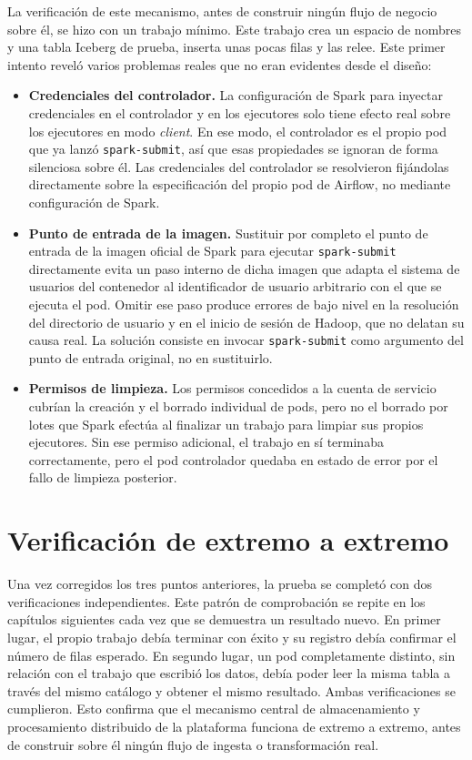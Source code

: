 La verificación de este mecanismo, antes de construir ningún flujo de
negocio sobre él, se hizo con un trabajo mínimo. Este trabajo crea un
espacio de nombres y una tabla Iceberg de prueba, inserta unas pocas filas
y las relee. Este primer intento reveló varios problemas reales que no
eran evidentes desde el diseño:

\begin{itemize}
  \item \textbf{Credenciales del controlador.} La configuración de Spark
  para inyectar credenciales en el controlador y en los ejecutores solo
  tiene efecto real sobre los ejecutores en modo \textit{client}. En ese
  modo, el controlador es el propio pod que ya lanzó
  \texttt{spark-submit}, así que esas propiedades se ignoran de forma
  silenciosa sobre él. Las credenciales del controlador se resolvieron
  fijándolas directamente sobre la especificación del propio pod de
  Airflow, no mediante configuración de Spark.
  \item \textbf{Punto de entrada de la imagen.} Sustituir por completo el
  punto de entrada de la imagen oficial de Spark para ejecutar
  \texttt{spark-submit} directamente evita un paso interno de dicha
  imagen que adapta el sistema de usuarios del contenedor al
  identificador de usuario arbitrario con el que se ejecuta el pod. Omitir
  ese paso produce errores de bajo nivel en la resolución del directorio
  de usuario y en el inicio de sesión de Hadoop, que no delatan su causa
  real. La solución consiste en invocar \texttt{spark-submit} como
  argumento del punto de entrada original, no en sustituirlo.
  \item \textbf{Permisos de limpieza.} Los permisos concedidos a la cuenta
  de servicio cubrían la creación y el borrado individual de pods, pero no
  el borrado por lotes que Spark efectúa al finalizar un trabajo para
  limpiar sus propios ejecutores. Sin ese permiso adicional, el trabajo en
  sí terminaba correctamente, pero el pod controlador quedaba en estado de
  error por el fallo de limpieza posterior.
\end{itemize}

\section{Verificación de extremo a extremo}
\label{sec:infraestructura_verificacion}

Una vez corregidos los tres puntos anteriores, la prueba se completó con
dos verificaciones independientes. Este patrón de comprobación se repite
en los capítulos siguientes cada vez que se demuestra un resultado nuevo.
En primer lugar, el propio trabajo debía terminar con éxito y su registro
debía confirmar el número de filas esperado. En segundo lugar, un pod
completamente distinto, sin relación con el trabajo que escribió los
datos, debía poder leer la misma tabla a través del mismo catálogo y
obtener el mismo resultado. Ambas verificaciones se cumplieron. Esto
confirma que el mecanismo central de almacenamiento y procesamiento
distribuido de la plataforma funciona de extremo a extremo, antes de
construir sobre él ningún flujo de ingesta o transformación real.

